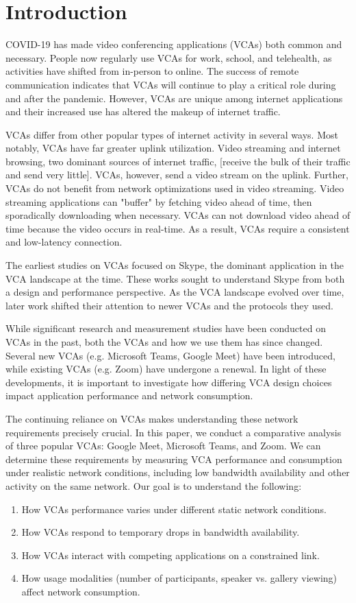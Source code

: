 \section{Introduction}\label{sec:intro}
COVID-19 has made video conferencing applications (VCAs) both common and necessary. People now regularly use VCAs for work, school, and telehealth, as activities have shifted from in-person to online. The success of remote communication indicates that VCAs will continue to play a critical role during and after the pandemic. However, VCAs are unique among internet applications and their increased use has altered the makeup of internet traffic. 

VCAs differ from other popular types of internet activity in several ways. Most notably, VCAs have far greater uplink utilization. Video streaming and internet browsing, two dominant sources of internet traffic, [receive the bulk of their traffic and send very little]. VCAs, however, send a video stream on the uplink. Further, VCAs do not benefit from network optimizations used in video streaming. Video streaming applications can "buffer" by fetching video ahead of time, then sporadically downloading when necessary. VCAs can not download video ahead of time because the video occurs in real-time. As a result, VCAs require a consistent and low-latency connection.

The earliest studies on VCAs focused on Skype, the dominant application in the VCA landscape at the time. These works sought to understand Skype from both a design and performance perspective. As the VCA landscape evolved over time, later work shifted their attention to newer VCAs and the protocols they used. 

While significant research and measurement studies have been conducted on VCAs in the past, both the VCAs and how we use them has since changed. Several new VCAs (e.g. Microsoft Teams, Google Meet) have been introduced, while existing VCAs (e.g. Zoom) have undergone a renewal. In light of these developments, it is important to investigate how differing VCA design choices impact application performance and network consumption. 


The continuing reliance on VCAs makes understanding these network requirements precisely crucial. In this paper, we conduct a comparative analysis of three popular VCAs: Google Meet, Microsoft Teams, and Zoom. We can determine these requirements by measuring VCA performance and consumption under realistic network conditions, including low bandwidth availability and other activity on the same network. Our goal is to understand the following:
\begin{enumerate}
    \item How VCAs performance varies under different static network conditions.
    \item How VCAs respond to temporary drops in bandwidth availability.
    \item How VCAs interact with competing applications on a constrained link.
    \item How usage modalities (number of participants, speaker vs. gallery viewing) affect network consumption.
\end{enumerate}

